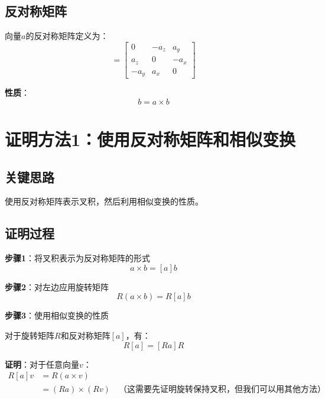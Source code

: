 \documentclass[12pt,a4paper]{article}
\begin{document}
\subsection{反对称矩阵}

向量$a$的反对称矩阵定义为：
\begin{equation}
[a] = \begin{bmatrix}
0 & -a_z & a_y \\
a_z & 0 & -a_x \\
-a_y & a_x & 0
\end{bmatrix}
\end{equation}

\textbf{性质}：
\begin{equation}
[a] b = a \times b
\end{equation}

\section{证明方法1：使用反对称矩阵和相似变换}

\subsection{关键思路}

使用反对称矩阵表示叉积，然后利用相似变换的性质。

\subsection{证明过程}

\textbf{步骤1}：将叉积表示为反对称矩阵的形式
\begin{equation}
a \times b = [a] b
\end{equation}

\textbf{步骤2}：对左边应用旋转矩阵
\begin{equation}
R(a \times b) = R [a] b
\end{equation}

\textbf{步骤3}：使用相似变换的性质

对于旋转矩阵$R$和反对称矩阵$[a]$，有：
\begin{equation}
R [a] = [Ra] R
\end{equation}

\textbf{证明}：对于任意向量$v$：
\begin{align}
R [a] v &= R (a \times v) \\
&= (Ra) \times (Rv) \quad \text{（这需要先证明旋转保持叉积，但我们可以用其他方法）}
\end{align}
\end{document}
